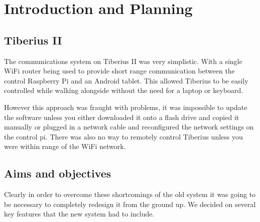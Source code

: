 \section{Introduction and Planning}
\subsection{Tiberius II}
The communications system on Tiberius II was very simplistic. With a single WiFi router being used to provide short range communication between the control Raspberry Pi and an Android tablet. This allowed Tiberius to be easily controlled while walking alongside without the need for a laptop or keyboard.

However this approach was fraught with problems, it was impossible to update the software unless you either downloaded it onto a flash drive and copied it manually or plugged in a network cable and reconfigured the network settings on the control pi. There was also no way to remotely control Tiberius unless you were within range of the WiFi network.



\subsection{Aims and objectives}
Clearly in order to overcome these shortcomings of the old system it was going to be necessary to completely redesign it from the ground up. 
\newline
We decided on several key features that the new system had to include.

